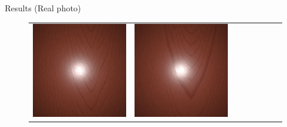 \documentclass[final]{beamer}
\newlength{\twocolwid}
\newlength{\resultwidth}
\begin{document}
\begin{frame}[t]
\begin{columns}[t]
\begin{column}{\twocolwid}
\begin{block}{Results (Real photo)}
\begin{figure}[t]
\begin{tabular}{ccrclccc}
            		\includegraphics[width=\resultwidth]{real/wood/good2.jpg} &
            		\includegraphics[width=\resultwidth]{real/wood/good3.jpg} &

\end{tabular}
\end{figure}
\end{block}
\end{column}
\end{columns}
\end{frame}
\end{document}
